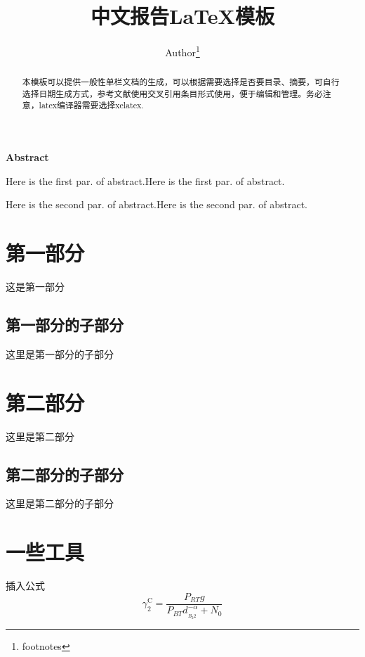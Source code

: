 \documentclass[UTF8,a4paper,12pt]{ctexart}
\title{\textbf{\Large{中文报告\LaTeX{}模板}}}
\author{ Author\thanks{footnotes} }
\begin{document}
 
\maketitle
 
\begin{abstract}
本模板可以提供一般性单栏文档的生成，可以根据需要选择是否要目录、摘要，可自行选择日期生成方式，参考文献使用交叉引用条目形式使用，便于编辑和管理。务必注意，latex编译器需要选择xelatex.
\end{abstract}
 
\begin{center}
\large{\textbf{Abstract}}
\end{center}
 
\begin{adjustwidth}{1cm}{1cm}
\hspace{1.5em}Here is the first par. of abstract.Here is the first par. of abstract.
 
\noindent\hspace{1.5em}Here is the second par. of abstract.Here is the second par. of abstract.
\end{adjustwidth}
 
 
 
\section{第一部分}
这是第一部分
\subsection{第一部分的子部分}
这里是第一部分的子部分
 
\section{第二部分}
这里是第二部分 \cite{ref1,ref2}
\subsection{第二部分的子部分}
这里是第二部分的子部分
 
\section{一些工具}
插入公式
\begin{equation}\label{eq}
  \gamma _2^{\text{C}} = \frac{{{P_{RT}}g}}{{{P_{BT}}d_{_{{B_2}2}}^{ - \alpha } + {N_0}}}
\end{equation}
 
\end{document}
